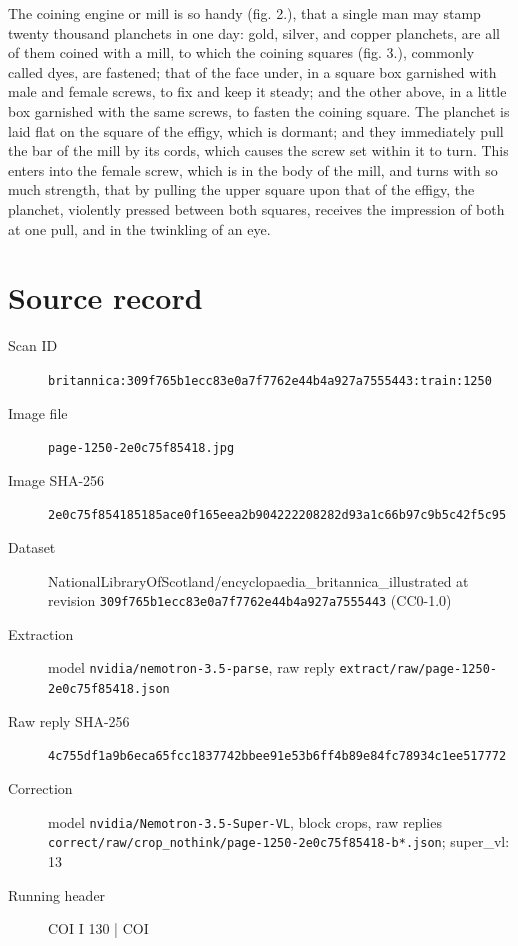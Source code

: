 \documentclass{article}
\begin{document}
The coining engine or mill is so handy (fig. 2.), that a single man may stamp twenty thousand planchets in one day: gold, silver, and copper planchets, are all of them coined with a mill, to which the coining squares (fig. 3.), commonly called dyes, are fastened; that of the face under, in a square box garnished with male and female screws, to fix and keep it steady; and the other above, in a little box garnished with the same screws, to fasten the coining square. The planchet is laid flat on the square of the effigy, which is dormant; and they immediately pull the bar of the mill by its cords, which causes the screw set within it to turn. This enters into the female screw, which is in the body of the mill, and turns with so much strength, that by pulling the upper square upon that of the effigy, the planchet, violently pressed between both squares, receives the impression of both at one pull, and in the twinkling of an eye.


\section*{Source record}
\begin{description}
\item[Scan ID] \texttt{britannica:309f765b1ecc83e0a7f7762e44b4a927a7555443:train:1250}
\item[Image file] \texttt{page-1250-2e0c75f85418.jpg}
\item[Image SHA-256] \texttt{2e0c75f854185185ace0f165eea2b904222208282d93a1c66b97c9b5c42f5c95}
\item[Dataset] NationalLibraryOfScotland/encyclopaedia\_britannica\_illustrated at revision \texttt{309f765b1ecc83e0a7f7762e44b4a927a7555443} (CC0-1.0)
\item[Extraction] model \texttt{nvidia/nemotron-3.5-parse}, raw reply \texttt{extract/raw/page-1250-2e0c75f85418.json}
\item[Raw reply SHA-256] \texttt{4c755df1a9b6eca65fcc1837742bbee91e53b6ff4b89e84fc78934c1ee517772}
\item[Correction] model \texttt{nvidia/Nemotron-3.5-Super-VL}, block crops, raw replies \texttt{correct/raw/crop\_nothink/page-1250-2e0c75f85418-b*.json}; super\_vl: 13
\item[Running header] COI I 130 | COI
\end{description}
\end{document}
